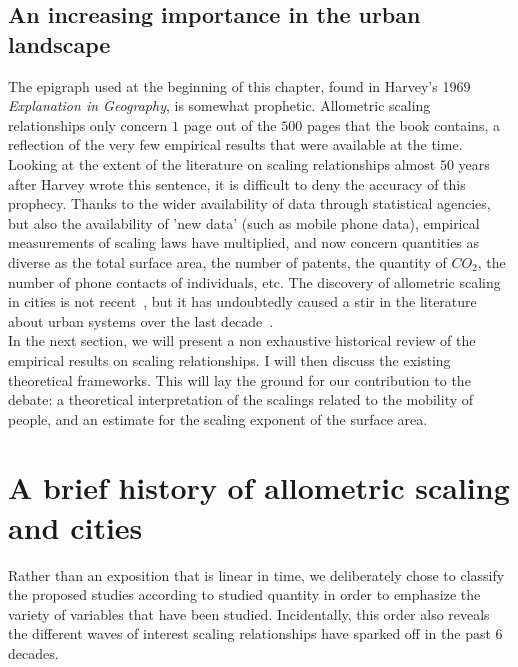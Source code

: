 \subsection{An increasing importance in the urban landscape}
\label{sub:an_increasing_place_in_the_landscape}


The epigraph used at the beginning of this chapter, found in Harvey's 1969
\emph{Explanation in Geography}, is somewhat prophetic.  Allometric scaling
relationships only concern $1$ page out of the $500$ pages that the book
contains, a reflection of the very few empirical results that were available at
the time.  Looking at the extent of the literature on scaling relationships
almost $50$ years after Harvey wrote this sentence, it is difficult to deny the
accuracy of this prophecy. Thanks to the wider availability of data through
statistical agencies, but also the availability of 'new data' (such as mobile
phone data), empirical measurements of scaling laws have multiplied, and now
concern quantities as diverse as the total surface area, the number of patents,
the quantity of $CO_2$, the number of phone contacts of individuals, etc. 
The discovery of allometric scaling in cities is not recent~\cite{Stewart:1947},
but it has undoubtedly caused a stir in the literature about urban systems over
the last
decade~\cite{Bettencourt:2007,Pumain:2004,Bettencourt:2013,Louf:2014_scaling,Louf:2014_smog,Arcaute:2014}.\\


In the next section, we will present a non exhaustive historical review of the
empirical results on scaling relationships. I will then discuss the existing
theoretical frameworks. This will lay the ground for our contribution to the
debate: a theoretical interpretation of the scalings related to the mobility of
people, and an estimate for the scaling exponent of the surface area.  



\section{A brief history of allometric scaling and cities}
\label{sec:a_brief_history_of_allometric_scaling_and_cities} 

Rather than an exposition that is linear in time, we deliberately chose to
classify the proposed studies according to studied quantity in order to
emphasize the variety of variables that have been studied. Incidentally, this
order also reveals the different waves of interest scaling relationships have
sparked off in the past $6$ decades. 

